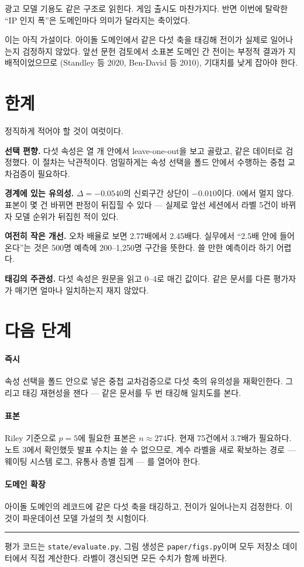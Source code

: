\documentclass[10pt]{article}
\begin{document}
광고 모델 기용도 같은 구조로 읽힌다. 게임 출시도 마찬가지다.
반면 이번에 탈락한 ``IP 인지 폭''은 도메인마다 의미가 달라지는 축이었다.

{이는 아직 가설이다. 아이돌 도메인에서 같은 다섯 축을 태깅해 전이가 실제로 일어나는지
검정하지 않았다. 앞선 문헌 검토에서 소표본 도메인 간 전이는 부정적 결과가 지배적이었으므로
(Standley 등 2020, Ben-David 등 2010), 기대치를 낮게 잡아야 한다.}

\section{한계}

정직하게 적어야 할 것이 여럿이다.

\textbf{선택 편향.} 다섯 속성은 열 개 안에서 leave-one-out을 보고 골랐고, 같은 데이터로
검정했다. 이 절차는 낙관적이다. 엄밀하게는 속성 선택을 폴드 안에서 수행하는 중첩
교차검증이 필요하다.

\textbf{경계에 있는 유의성.} $\Delta=-0.0540$의 신뢰구간 상단이 $-0.010$이다.
0에서 멀지 않다. 표본이 몇 건 바뀌면 판정이 뒤집힐 수 있다 --- 실제로 앞선 세션에서
라벨 5건이 바뀌자 모델 순위가 뒤집힌 적이 있다.

\textbf{여전히 작은 개선.} 오차 배율로 보면 2.77배에서 2.45배다. 실무에서 ``2.5배 안에
들어온다''는 것은 500명 예측에 200--1{,}250명 구간을 뜻한다. 쓸 만한 예측이라 하기 어렵다.

\textbf{태깅의 주관성.} 다섯 속성은 원문을 읽고 0--4로 매긴 값이다. 같은 문서를 다른
평가자가 매기면 얼마나 일치하는지 재지 않았다.

\section{다음 단계}

\paragraph{즉시}
속성 선택을 폴드 안으로 넣은 중첩 교차검증으로 다섯 축의 유의성을 재확인한다.
그리고 태깅 재현성을 잰다 --- 같은 문서를 두 번 태깅해 일치도를 본다.

\paragraph{표본}
Riley 기준으로 $p{=}5$에 필요한 표본은 $n \approx 274$다. 현재 75건에서 3.7배가
필요하다. 노트 3에서 확인했듯 발표 수치는 쓸 수 없으므로, 계수 라벨을 새로 확보하는
경로 --- 웨이팅 시스템 로그, 유통사 층별 집계 --- 를 열어야 한다.

\paragraph{도메인 확장}
아이돌 도메인의 레코드에 같은 다섯 축을 태깅하고, 전이가 일어나는지 검정한다.
이것이 파운데이션 모델 가설의 첫 시험이다.

\vspace{0.7em}
\hrule
\vspace{0.4em}
{\footnotesize\color{black!60}
평가 코드는 \texttt{state/evaluate.py}, 그림 생성은 \texttt{paper/figs.py}이며 모두
저장소 데이터에서 직접 계산한다. 라벨이 갱신되면 모든 수치가 함께 바뀐다.}
\end{document}
